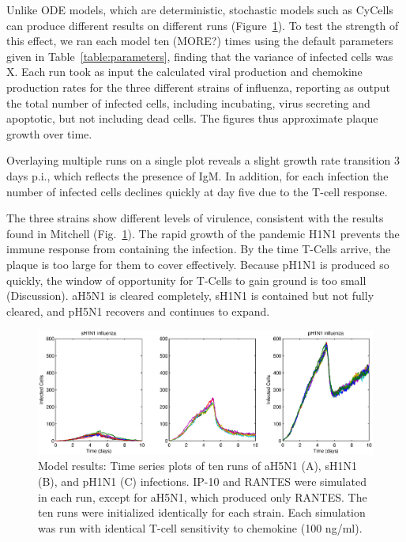\documentclass[10pt]{article}
\begin{document}
Unlike ODE models, which are deterministic, stochastic models such as CyCells can produce different results on different runs (Figure~\ref{fig:variance}).  To test the strength of this effect, we ran each model ten (MORE?) times using the default parameters given in Table~\ref{table:parameters}, finding that the variance of infected cells was X.  Each run took as input the calculated viral production and chemokine production rates for the three different strains of influenza, reporting as output the total number of infected cells, including incubating, virus secreting and apoptotic, but not including dead cells.  The figures thus approximate plaque growth over time.

Overlaying multiple runs on a single plot reveals a slight growth rate transition 3 days p.i., which reflects the presence of IgM.  In addition, for each infection the number of infected cells declines quickly at day five due to the T-cell response. 

The three strains show different levels of virulence, consistent with the results found in Mitchell (Fig.~\ref{fig:variance}).  The rapid growth of the pandemic H1N1 prevents the immune response from containing the infection.  By the time T-Cells arrive, the plaque is too large for them  to cover effectively.  Because pH1N1 is produced so quickly, the window of opportunity for T-Cells to gain ground is too small (Discussion).  aH5N1 is cleared completely, sH1N1 is contained but not fully cleared, and pH5N1 recovers and continues to expand.

\begin{figure}[ht!]
\begin{center}
 \includegraphics[width=\textwidth]{variance}
 \end{center}
\caption{Model results: Time series plots of ten runs of aH5N1 (A), sH1N1 (B), and pH1N1 (C) infections. IP-10 and RANTES were simulated in each run, except for aH5N1, which  produced only RANTES.  The ten runs were initialized identically for each strain.  Each simulation was run with identical T-cell sensitivity to chemokine (100 ng/ml).} 
 \label{fig:variance}
\end{figure}
\end{document}
